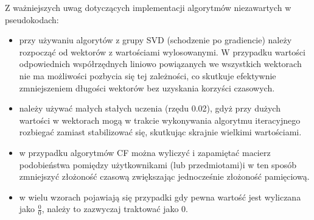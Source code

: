 \documentclass{pracamgr}
\begin{document}
   
   Z ważniejszych uwag dotyczących implementacji algorytmów niezawartych w pseudokodach:
   \begin{itemize}\itemsep1pt \parskip0pt 
    \item przy używaniu algorytów z grupy SVD (schodzenie po gradiencie) należy rozpocząć od wektorów z wartościami wylosowanymi.
     W przypadku wartości odpowiednich współrzędnych liniowo powiązanych we wszystkich wektorach nie ma możliwości pozbycia się tej zależności,
     co skutkuje efektywnie zmniejszeniem długości wektorów bez uzyskania korzyści czasowych.%
    \item należy używać małych stałych uczenia (rzędu 0.02), gdyż przy dużych wartości w wektorach mogą w trakcie wykonywania algorytmu
     iteracyjnego rozbiegać zamiast stabilizować się, skutkując skrajnie wielkimi wartościami.%
    \item w przypadku algorytmów CF można wyliczyć i zapamiętać macierz podobieństwa pomiędzy użytkownikami (lub przedmiotami)i w ten sposób
     zmniejszyć złożoność czasową zwiększając jednocześnie złożoność pamięciową.
    \item w wielu wzorach pojawiają się przypadki gdy pewna wartość jest wyliczana jako $\frac{0}{0}$, należy to zazwyczaj traktować jako $0$.
   \end{itemize}
\end{document}
